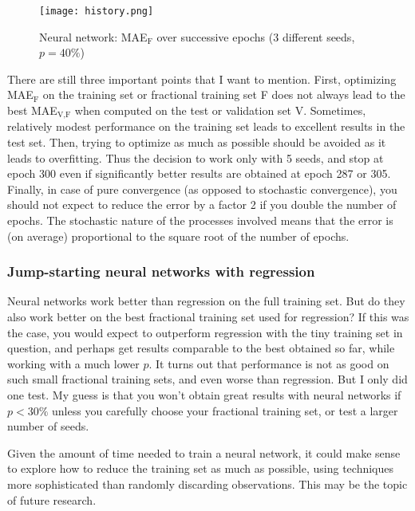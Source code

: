 \documentclass[oneside,10pt]{book}
\begin{document}
\begin{figure}[H]
\centering
\texttt{[image: history.png]}
\caption{Neural network: MAE$_{\text{F}}$ over successive epochs (3 different seeds, $p=40\%$)}
\label{fig:lo09bre76}
\end{figure}

There are still three important points that I want to mention. First, optimizing MAE$_{\text{F}}$ on the training set or fractional training set F does not always lead to the best MAE$_{\text{V,F}}$ when computed on the test or validation set V. Sometimes, relatively modest performance on the training set leads to excellent results in the test set.
 Then, trying to optimize as much as possible should be avoided as it leads to overfitting. Thus the decision to work only with 5 seeds, and stop at epoch 300 even if significantly better results are obtained at epoch 287 or 305. Finally, in case of pure convergence (as opposed to stochastic convergence), you should not expect to reduce the error by a factor 2 if you double the number of epochs.
 The stochastic nature of the processes involved means that the error is (on average) proportional to the square root of the number of epochs.



\subsubsection{Jump-starting neural networks with regression}

Neural networks work better than regression on the full training set. But do they also work better on the best fractional training set used for regression? If this was the case,
  you would expect to outperform regression with the tiny training set in question, and perhaps get results comparable to the best obtained so far, while working
 with a much lower $p$. It turns out that performance is not as good on such small fractional training sets, and even worse than regression. But I only did one test. My guess is that you won't obtain great results with neural networks if $p<30\%$ unless you carefully choose your fractional training set, or test a larger number of seeds.

Given the amount of time needed to train a neural network, it could make sense to explore how to reduce the training set as much as possible, using techniques
 more sophisticated than randomly discarding observations. This may be the topic of future research.
\end{document}
